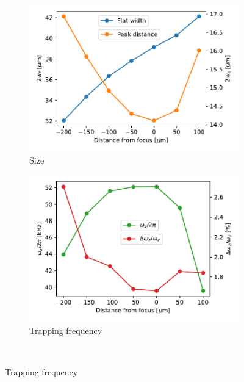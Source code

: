\begin{figure}
    \begin{subfigure}{0.5\textwidth}
        \includegraphics[width=\textwidth]{chapters/chapter_3/figures/size_focus.pdf}
        \caption{Size}
        \label{fig:focus_size}
    \end{subfigure}
    \begin{subfigure}{0.5\textwidth}
        \includegraphics[width=\textwidth]{chapters/chapter_3/figures/trapp_freq_focus.pdf}
        \caption{Trapping frequency}
        \label{fig:focus_omega}
    \end{subfigure}\\


\end{figure}
